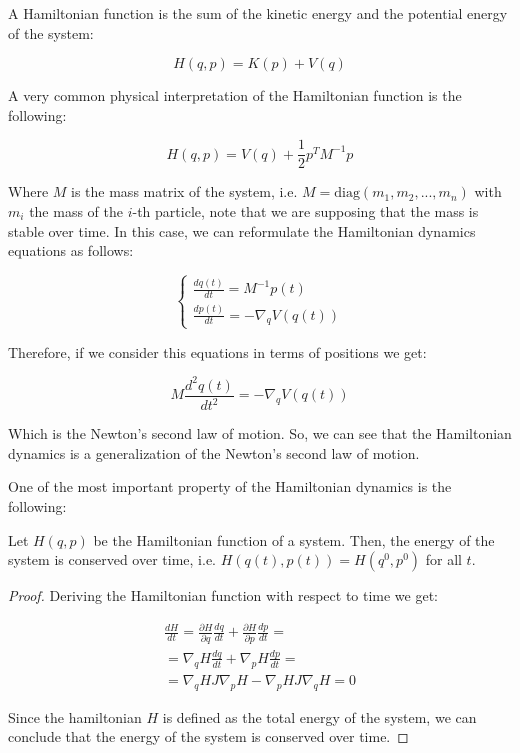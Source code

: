 \documentclass{article}
\begin{document}
A Hamiltonian function is the sum of the kinetic energy and the potential energy of the system:

\begin{equation*}
	H(q,p) = K(p) + V(q)
\end{equation*}

A very common physical interpretation of the Hamiltonian function is the following:

\begin{equation*}
	H(q,p) = V(q) + \frac{1}{2} p^T M^{-1} p
\end{equation*}

Where \(M\) is the mass matrix of the system, i.e. \(M = \mathrm{diag}(m_1, m_2, ..., m_n)\) with \(m_i\) the mass of the \(i\)-th particle, note that we are supposing that the mass is stable over time. In this case, we can reformulate the Hamiltonian dynamics equations as follows:

\begin{equation} 
	\begin{cases}
		\frac{dq(t)}{dt} = M^{-1} p(t) \\
		\frac{dp(t)}{dt} = -\nabla_q V(q(t))
	\end{cases}
	\label{eq:hamiltoniandynamics3}
\end{equation}

Therefore, if we consider this equations in terms of positions we get:

\begin{equation*} 
	M\frac{d^2q(t)}{dt^2} = -\nabla_q V(q(t))
\end{equation*}

Which is the Newton's second law of motion. So, we can see that the Hamiltonian dynamics is a generalization of the Newton's second law of motion.

One of the most important property of the Hamiltonian dynamics is the following:

\begin{theorem}
	Let \(H(q,p)\) be the Hamiltonian function of a system. Then, the energy of the system is conserved over time, i.e. \(H(q(t),p(t)) = H(q^0,p^0)\) for all \(t\).
\end{theorem}

\begin{proof}
	Deriving the Hamiltonian function with respect to time we get:

	\begin{gather*}
		\frac{dH}{dt} = \frac{\partial H}{\partial q} \frac{dq}{dt} + \frac{\partial H}{\partial p} \frac{dp}{dt} = \\ 
		= \nabla_q H \frac{dq}{dt} + \nabla_p H \frac{dp}{dt} = \\ 
		= \nabla_q H J \nabla_p H - \nabla_p H J \nabla_q H = 0
	\end{gather*}

	Since the hamiltonian \(H\) is defined as the total energy of the system, we can conclude that the energy of the system is conserved over time.
\end{proof}
\end{document}
